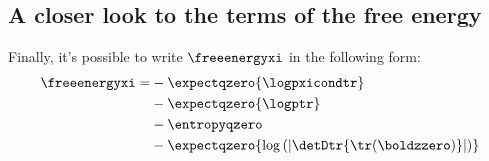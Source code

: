 \subsection{A closer look to the terms of the free energy}


Finally, it's possible to write $\freeenergyxi$ in the following form:
\begin{align}
\freeenergyxi = &- \expectqzero{\logpxicondtr} \\
    &- \expectqzero{\logptr} \\
    &- \entropyqzero \\
    &- \expectqzero{\log \left( |\detDtr{\tr(\boldzzero)}| \right)}
\end{align}


